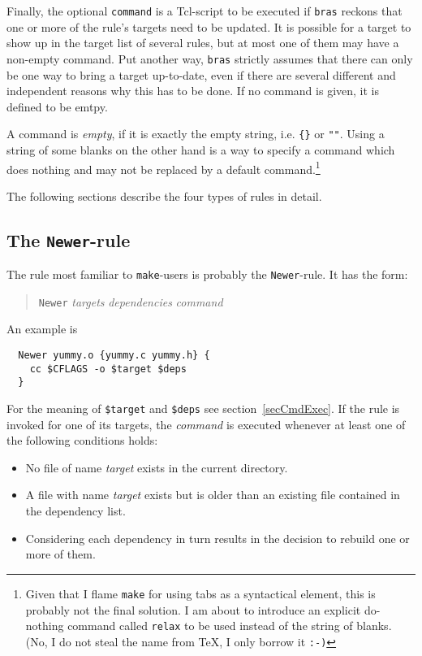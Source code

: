 \documentclass[12pt]{article}
\newcommand{\bras}{\texttt{bras}}
\newcommand{\make}{\texttt{make}}
\begin{document}
Finally, the optional \texttt{command} is a Tcl-script to be executed
if \bras{} reckons that one or more of the rule's targets need to be
updated. It is possible for a target to show up in the target list of
several rules, but at most one of them may have a non-empty
command. Put another way, \bras{} strictly assumes that there can only
be one way to bring a target up-to-date, even if there are several
different and independent reasons why this has to be done. If no
command is given, it is defined to be emtpy.

A command is \textit{empty}, if it is exactly the empty string,
i.e. \verb+{}+ or \verb+""+. Using a string of some blanks on the
other hand is a way to specify a command which does nothing and may
not be replaced by a default command.\footnote{Given that I flame
\make{} for using tabs as a syntactical element, this is probably not
the final solution. I am about to introduce an explicit do-nothing
command called
\texttt{relax} to be used instead of the string of blanks. (No, I do
not steal the name from \TeX, I only borrow it \texttt{:-)}}

The following sections describe the four types of rules in detail.

\subsection{The \texttt{Newer}-rule}
\label{secNewer}
The rule most familiar to \make-users is probably the
\texttt{Newer}-rule. It has the form:
\begin{quote}
  \texttt{Newer} \textit{targets} \textit{dependencies} \textit{command}
\end{quote}
An example is
\begin{verbatim}
  Newer yummy.o {yummy.c yummy.h} {
    cc $CFLAGS -o $target $deps
  }
\end{verbatim}
For the meaning of \texttt{\$target} and \texttt{\$deps} see
section~\ref{secCmdExec}. If the rule is invoked for one of its
targets, the \textit{command} is executed whenever at least one of the
following conditions holds:
\begin{itemize}
\item No file of name \textit{target} exists in the current directory.
\item A file with name \textit{target} exists but is older than an
existing file contained in the dependency list.
\item Considering each dependency in turn results in the decision to
rebuild one or more of them.
\end{itemize}
\end{document}
